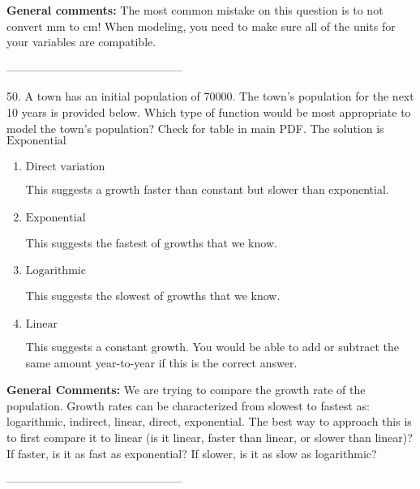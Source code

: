 \documentclass{article}[14pt]
\begin{document}
\textbf{General comments:} The most common mistake on this question is to not convert mm to cm! When modeling, you need to make sure all of the units for your variables are compatible.

-----------------------------------------------

50. A town has an initial population of 70000. The town's population for the next 10 years is provided below. Which type of function would be most appropriate to model the town's population?
Check for table in main PDF. 
The solution is $ \text{Exponential} $ 

\begin{enumerate}[label=\Alph*.] 
\item $ \text{Direct variation} $ 

 This suggests a growth faster than constant but slower than exponential. 
\item $ \text{Exponential} $ 

 This suggests the fastest of growths that we know. 
\item $ \text{Logarithmic} $ 

 This suggests the slowest of growths that we know. 
\item $ \text{Linear} $ 

 This suggests a constant growth. You would be able to add or subtract the same amount year-to-year if this is the correct answer. 
\end{enumerate} 
 
\textbf{General Comments:} We are trying to compare the growth rate of the population. Growth rates can be characterized from slowest to fastest as: logarithmic, indirect, linear, direct, exponential. The best way to approach this is to first compare it to linear (is it linear, faster than linear, or slower than linear)? If faster, is it as fast as exponential? If slower, is it as slow as logarithmic?

-----------------------------------------------
\end{document}
